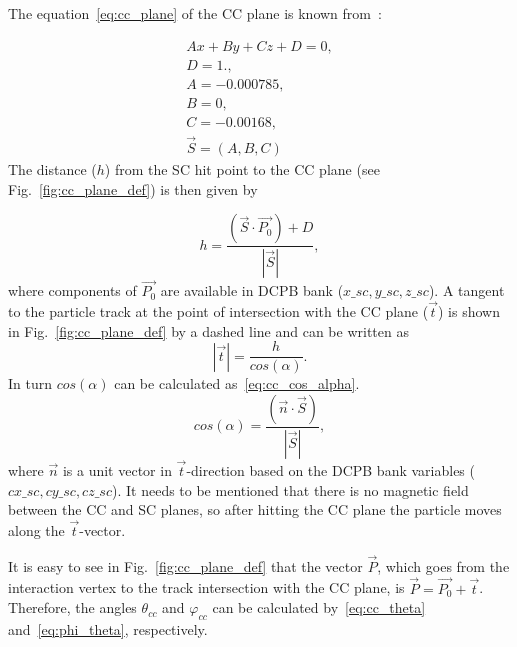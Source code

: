 
The equation~\ref{eq:cc_plane} of the CC plane is known from~\cite{Osipenko:2004}: 

\begin{equation}
\begin{aligned}
 Ax+By+Cz+D = 0,  \\ \label{eq:cc_plane}
  D=1.,  \\ 
  A=-0.000785, \\ 
  B=0,  \\
  C=-0.00168, \\
  \overrightarrow{S} = (A,B,C)
\end{aligned}  
\end{equation}
The distance ($h$) from the SC hit point to the CC plane (see Fig.~\ref{fig:cc_plane_def}) is then given by

\begin{equation}
h=\frac{(\overrightarrow{S} \cdot \overrightarrow{P_{0}})+D}{\left |\overrightarrow{S}  \right |},
\label{eq:cc_h_distance}
\end{equation}
where components of $\overrightarrow{P_{0}}$ are available in  DCPB bank ($x\_sc, y\_sc, z\_sc$). 
 A tangent to the particle track at the point of intersection with the CC plane ($ \vec t$) is shown in Fig.~\ref{fig:cc_plane_def} by a dashed line and can be written as 
\begin{equation}
\left | \overrightarrow{t} \right |=\frac{h}{cos(\alpha )}.
\label{eq:cc_t_vec} 
\end{equation}
In turn $cos(\alpha )$ can be calculated as~\ref{eq:cc_cos_alpha}.
\begin{equation}
cos(\alpha )=\frac{(\overrightarrow{n} \cdot \overrightarrow{S})}{\left | \overrightarrow{S} \right |},
\label{eq:cc_cos_alpha} 
\end{equation}
 where $ \vec n$ is a unit vector in $ \vec t$-direction based on the DCPB bank variables ($cx\_sc, cy\_sc, cz\_sc$). It needs to be mentioned that there is no magnetic field between the CC and SC planes, so after hitting the CC plane the particle moves along the $ \vec t$-vector.






It is easy to see in Fig.~\ref{fig:cc_plane_def} that the vector $\overrightarrow{P}$, which goes from the  interaction vertex to the track intersection with the CC plane, is $\overrightarrow{P}=\overrightarrow{P_{0}}+\overrightarrow{t}$. Therefore, the angles $\theta_{cc}$ and $\varphi_{cc}$ can be calculated by~\ref{eq:cc_theta} and~\ref{eq:phi_theta}, respectively.


